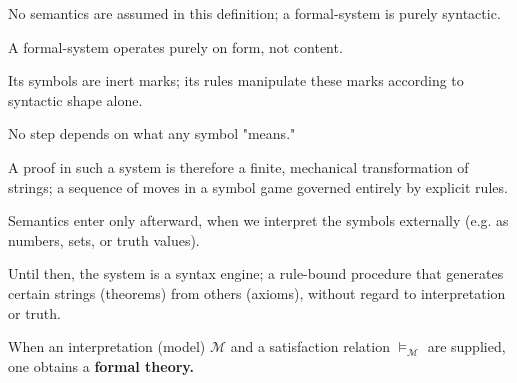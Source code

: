 \documentclass{article}
\begin{document}
\begin{remark}
No \@{semantics} are assumed in this definition; a \@{formal-system} is purely \@{syntactic}.

A \@{formal-system} operates purely on \@{form}, not content.

Its symbols are inert marks; its rules manipulate these marks according to syntactic shape alone.

No step depends on what any symbol "means."

A \@{proof} in such a system is therefore a finite, mechanical transformation of strings; a sequence of moves in a symbol game governed entirely by explicit rules.

Semantics enter only afterward, when we interpret the symbols externally (e.g. as numbers, sets, or truth values).

Until then, the system is a syntax engine; a rule-bound procedure that generates certain strings (\@{theorems}) from others (axioms), without regard to interpretation or truth.
\end{remark}

\begin{note}
When an interpretation (model) $\mathcal{M}$ and a satisfaction relation $\models_{\mathcal{M}}$ are supplied, one obtains a \textbf{formal theory.}
\end{note}
\end{document}
